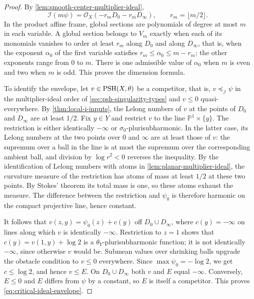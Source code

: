\begin{proof}
By \cref{lem:smooth-center-multiplier-ideal},
\[
 \mathcal I(m\psi)=
 \mathcal O_X(-r_mD_0-r_mD_\infty),\qquad r_m=\lfloor m/2\rfloor.
\]
In the product affine frame, global sections are polynomials of degree
at most $m$ in each variable. A global section belongs to $V_m$ exactly when each of its monomials vanishes to order at least $r_m$ along $D_0$ and along $D_\infty$, that is, when the exponent $\alpha_0$ of the first variable satisfies
$r_m\leq\alpha_0\leq m-r_m$; the other exponents range from
$0$ to $m$. There is one admissible value of $\alpha_0$ when $m$ is even and
two when $m$ is odd. This proves the dimension formula.

To identify the envelope, let $v\in\mathrm{PSH}(X,\theta)$ be a competitor, that is, $v\preceq_{\mathcal I}\psi$ in the multiplier-ideal order of \cref{sec:psh-singularity-types} and $v\leq0$ quasi-everywhere. By \cref{thm:local-i-inputs}, the Lelong numbers of $v$ at the points of $D_0$ and $D_\infty$ are at least $1/2$. Fix $y\in Y$ and restrict $v$ to the line $\mathbb P^1\times\{y\}$. The restriction is
either identically $-\infty$ or $\sigma_0$-plurisubharmonic. In the latter case, its Lelong numbers at the two points over $0$ and $\infty$ are at least those of $v$: the supremum over a ball in the line is at most the supremum over the corresponding ambient ball, and division by
$\log r^2<0$ reverses the inequality. By the identification of Lelong numbers with atoms in
\cref{lem:planar-multiplier-ideal}, the curvature measure of the restriction has
atoms of mass at least $1/2$ at these two points. By Stokes' theorem its total
mass is one, so these atoms exhaust the measure. The difference between the restriction and
$\psi_0$ is therefore harmonic on the compact projective line, hence
constant.

It follows that $v(z,y)=\psi_0(z)+c(y)$ off $D_0\cup D_\infty$, where $c(y)=-\infty$ on lines along which $v$ is identically $-\infty$. Restriction to $z=1$ shows that
$c(y)=v(1,y)+\log2$ is a $\theta_Y$-plurisubharmonic function; it is not identically $-\infty$, since otherwise $v$ would be. Submean values over shrinking balls upgrade the obstacle condition to $v\leq0$ everywhere. Since
$\max\psi_0=-\log2$, we get $c\leq\log2$, and hence $v\leq E$.
On $D_0\cup D_\infty$ both $v$ and $E$ equal $-\infty$.
Conversely, $E\leq0$ and $E$ differs from $\psi$ by a constant, so $E$ is itself a competitor. This proves \eqref{eq:critical-ideal-envelope}.


\end{proof}
